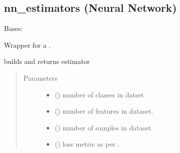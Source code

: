\documentclass[letterpaper,10pt,english]{sphinxmanual}
\begin{document}
\subsection{nn\_estimators (Neural Network)}
\label{\detokenize{estimators:module-mleap.estimators.nn_estimators}}\label{\detokenize{estimators:nn-estimators-neural-network}}

\begin{fulllineitems}
\label{\detokenize{estimators:mleap.estimators.nn_estimators.Deep_NN_Classifier}}
Bases: {\hyperref[\detokenize{estimators:mleap.estimators.mleap_estimator.MleapEstimator}]{}}

Wrapper for a .

\begin{fulllineitems}
\label{\detokenize{estimators:mleap.estimators.nn_estimators.Deep_NN_Classifier.build}}
builds and returns estimator
\begin{quote}\begin{description}
\item[{Parameters}] \leavevmode\begin{itemize}
\item {} 
 () \textendash{} number of classes in datset

\item {} 
 () \textendash{} number of features in dataset.

\item {} 
 () \textendash{} number of samples in dataset.

\item {} 
 () \textendash{} loss metric as per .


\end{itemize}
\end{description}
\end{quote}
\end{fulllineitems}
\end{fulllineitems}
\end{document}

